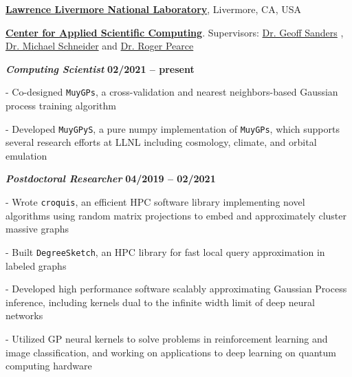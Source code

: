 \href{https://www.llnl.gov/}{\textbf{Lawrence Livermore National Laboratory}},
Livermore, CA, USA

\href{https://computation.llnl.gov/casc/}{\textbf{Center for Applied Scientific Computing}}.
Supervisors:               
\href{https://people.llnl.gov/sanders29}
{Dr. Geoff Sanders}
,
\href{https://pls.llnl.gov/people/staff-bios/physics/schneider-m}
{Dr. Michael Schneider}
and
\href{https://people.llnl.gov/pearce7}
{Dr. Roger Pearce}



\vspace{-0.5em}
\begin{outerlist}

\item[] \textbf{\textit{Computing Scientist}}%
\hfill \textbf{02/2021 -- present}

\begin{innerlist}

\item[-] Co-designed \texttt{MuyGPs}, a cross-validation and nearest neighbors-based Gaussian process training algorithm

\item[-] Developed \texttt{MuyGPyS}, a pure numpy implementation of \texttt{MuyGPs}, which supports several research efforts at LLNL including cosmology, climate, and orbital emulation 

\end{innerlist}

\item[] \textbf{\textit{Postdoctoral Researcher}}%
\hfill \textbf{04/2019 -- 02/2021}

\begin{innerlist}

\item[-] Wrote \texttt{croquis}, an efficient HPC software library implementing novel algorithms using random matrix projections to embed and approximately cluster massive graphs

\item[-] Built \texttt{DegreeSketch}, an HPC library for fast local query approximation in labeled graphs

\item[-] Developed high performance software scalably approximating Gaussian Process inference, including kernels dual to the infinite width limit of deep neural networks

\item[-] Utilized GP neural kernels to solve problems in reinforcement learning and image classification, and working on applications to deep learning on quantum computing hardware


\end{innerlist}
\end{outerlist}
